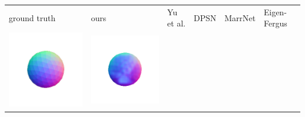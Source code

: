 \begin{tabularx}{\linewidth}{@{}Y@{}Y@{}Y@{}Y@{}Y@{}Y@{}}
ground truth & ours & Yu et al. & DPSN & MarrNet & Eigen-Fergus \\
\includegraphics[width=\linewidth]{semisynthetic/20160617_1_gt.png} &
\includegraphics[width=\linewidth]{semisynthetic/20160617_1_ours_out.png} &

\end{tabularx}
